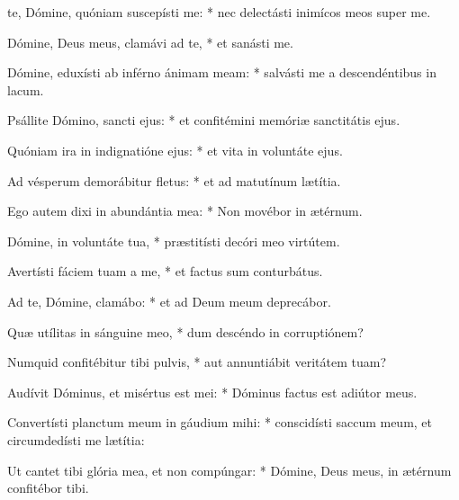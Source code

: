 \begin{psalmus}

		 te, Dómine, quóniam suscepísti me: * nec delectásti inimícos meos super me.

		Dómine, Deus meus, clamávi ad te, * et sanásti me.

		Dómine, eduxísti ab inférno ánimam meam: * salvásti me a descendéntibus in lacum.

		Psállite Dómino, sancti ejus: * et confitémini memóriæ sanctitátis ejus.

		Quóniam ira in indignatióne ejus: * et vita in voluntáte ejus.

		Ad vésperum demorábitur fletus: * et ad matutínum lætítia.

		Ego autem dixi in abundántia mea: * Non movébor in ætérnum.

		Dómine, in voluntáte tua, * præstitísti decóri meo virtútem.

		Avertísti fáciem tuam a me, * et factus sum conturbátus.

		Ad te, Dómine, clamábo: * et ad Deum meum deprecábor.

		Quæ utílitas in sánguine meo, * dum descéndo in corruptiónem?

		Numquid confitébitur tibi pulvis, * aut annuntiábit veritátem tuam?

		Audívit Dóminus, et misértus est mei: * Dóminus factus est adiútor meus.

		Convertísti planctum meum in gáudium mihi: * conscidísti saccum meum, et circumdedísti me lætítia:

		Ut cantet tibi glória mea, et non compúngar: * Dómine, Deus meus, in ætérnum confitébor tibi.

\end{psalmus}
